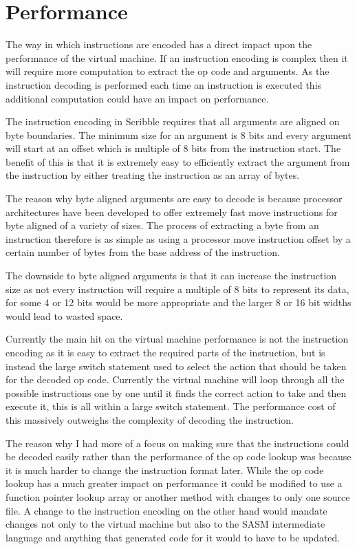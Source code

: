 \documentclass[]{final_report}
\begin{document}
\section{Performance}

The way in which instructions are encoded has a direct impact upon the performance of the virtual machine. If an instruction encoding is complex then it will require more computation to extract the op code and arguments. As the instruction decoding is performed each time an instruction is executed this additional computation could have an impact on performance.

The instruction encoding in Scribble requires that all arguments are aligned on byte boundaries. The minimum size for an argument is 8 bits and every argument will start at an offset which is multiple of 8 bits from the instruction start. The benefit of this is that it is extremely easy to efficiently extract the argument from the instruction by either treating the instruction as an array of bytes.

The reason why byte aligned arguments are easy to decode is because processor architectures have been developed to offer extremely fast move instructions for byte aligned of a variety of sizes. The process of extracting a byte from an instruction therefore is as simple as using a processor move instruction offset by a certain number of bytes from the base address of the instruction.

The downside to byte aligned arguments is that it can increase the instruction size as not every instruction will require a multiple of 8 bits to represent its data, for some 4 or 12 bits would be more appropriate and the larger 8 or 16 bit widths would lead to wasted space.

Currently the main hit on the virtual machine performance is not the instruction encoding as it is easy to extract the required parts of the instruction, but is instead the large switch statement used to select the action that should be taken for the decoded op code. Currently the virtual machine will loop through all the possible instructions one by one until it finds the correct action to take and then execute it, this is all within a large switch statement. The performance cost of this massively outweighs the complexity of decoding the instruction.

The reason why I had more of a focus on making sure that the instructions could be decoded easily rather than the performance of the op code lookup was because it is much harder to change the instruction format later. While the op code lookup has a much greater impact on performance it could be modified to use a function pointer lookup array or another method with changes to only one source file. A change to the instruction encoding on the other hand would mandate changes not only to the virtual machine but also to the SASM intermediate language and anything that generated code for it would to have to be updated.
\end{document}

